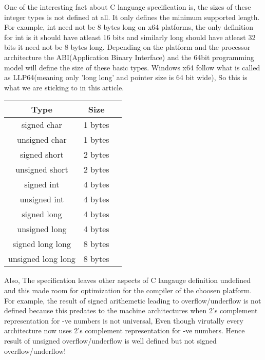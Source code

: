 \documentclass{article}
\begin{document}
One of the interesting fact about C language specification is, the sizes of
these integer types is not defined at all. It only defines the minimum supported
length. For example, int need not be 8 bytes long on x64 platforms, the only
definition for int is it should have atleast 16 bits and similarly long should
have atleast 32 bits it need not be 8 bytes long. Depending on the platform
and the processor architecture the ABI(Application Binary Interface) and the
64bit programming model will define the size of these basic types. Windows x64
follow what is called as LLP64(meaning only 'long long' and pointer size is 64
bit wide), So this is what we are sticking to in this article.

\begin{center}
\begin{tabular}{|c|c|c|}
 Type       &Size       \\
 \hline
 signed char         & 1 bytes \\
 unsigned char       & 1 bytes \\
 signed short        & 2 bytes \\
 unsigned short      & 2 bytes \\
 signed int          & 4 bytes \\
 unsigned int        & 4 bytes \\
 signed long         & 4 bytes \\
 unsigned long       & 4 bytes \\
 signed long long    & 8 bytes \\
 unsigned long long  & 8 bytes
\end{tabular}
\end{center}

Also, The specification leaves other aspects of C langauge definition undefined
and this made room for optimization for the compiler of the choosen platform.
For example, the result of signed arithemetic leading to overflow/underflow is
not defined because this predates to the machine architectures when 2's
complement representation for -ve numbers is not universal, Even though
virutally every architecture now uses 2's complement representation for -ve
numbers. Hence result of unsigned overflow/underflow is well defined but not
signed overflow/underflow!
\end{document}
